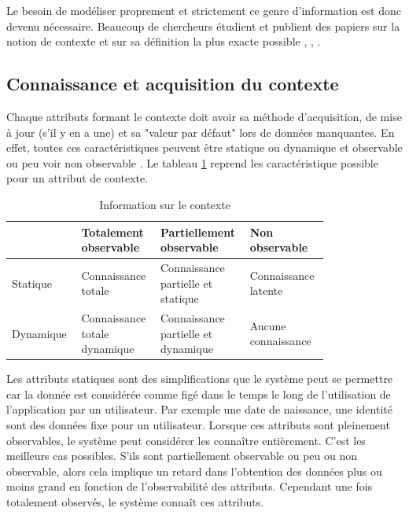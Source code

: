 \documentclass[conference]{./sty/IEEEtran}
\begin{document}
Le besoin de modéliser proprement et strictement ce genre d'information est
donc devenu nécessaire. Beaucoup de chercheurs étudient et publient des papiers
sur la notion de contexte et sur sa définition la plus exacte possible
\cite{DBLP:journals/tlt/VerbertMOWDBD12},
\cite{DBLP:reference/rsh/AdomaviciusT11},
\cite{DBLP:journals/aim/AdomaviciusMRT11}. \\

\subsection{Connaissance et acquisition du contexte}

Chaque attributs formant le contexte doit avoir sa méthode d'acquisition, de
mise à jour (s'il y en a une) et sa "valeur par défaut" lors de données
manquantes. En effet, toutes ces caractéristiques peuvent être statique ou
dynamique et observable ou peu voir non observable
\cite{DBLP:journals/aim/AdomaviciusMRT11}. Le tableau
\ref{tab:update_observability_context} reprend les caractéristique possible
pour un attribut de contexte. \\

\begin{table}
  \centering
  \caption{\label{tab:update_observability_context} Information sur le contexte \cite{DBLP:journals/aim/AdomaviciusMRT11}}
  \begin{tabular}{|p{0.20\linewidth}|p{0.20\linewidth}|p{0.20\linewidth}|p{0.20\linewidth}|}
    \hline
    ~ & Totalement observable & Partiellement observable & Non observable \\ \hline
    Statique & Connaissance totale & Connaissance partielle et statique & Connaissance latente \\ \hline
    Dynamique & Connaissance totale dynamique & Connaissance partielle et dynamique & Aucune connaissance \\ \hline
  \end{tabular}
\end{table}

Les attributs statiques sont des simplifications que le système peut se
permettre car la donnée est considérée comme figé dans le temps le long de
l'utilisation de l'application par un utilisateur. Par exemple une date de
naissance, une identité sont des données fixe pour un utilisateur. Lorsque ces
attributs sont pleinement observables, le système peut considérer les connaître
entièrement. C'est les meilleurs cas possibles. S'ils sont partiellement
observable ou peu ou non observable, alors cela implique un retard dans
l'obtention des données plus ou moins grand en fonction de l'observabilité des
attributs. Cependant une fois totalement observés, le système connaît ces
attributs. \\
\end{document}
